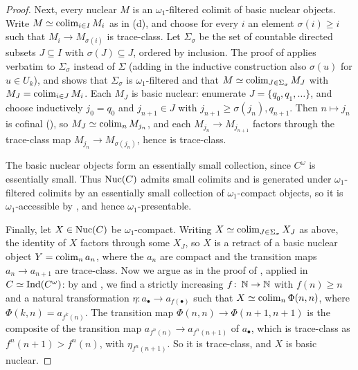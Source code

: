 \begin{proof}
		Next, every nuclear $M$ is an $\omega_1$-filtered colimit of basic nuclear objects. Write $M \simeq \operatorname{colim}_{i \in I} M_i$ as in (d), and choose for every $i$ an element $\sigma(i) \geq i$ such that $M_i \to M_{\sigma(i)}$ is trace-class. Let $\Sigma_{\sigma}$ be the set of countable directed subsets $J \subseteq I$ with $\sigma(J) \subseteq J$, ordered by inclusion. The proof of  applies verbatim to $\Sigma_{\sigma}$ instead of $\Sigma$ (adding in the inductive construction also $\sigma(u)$ for $u \in U_k$), and shows that $\Sigma_{\sigma}$ is $\omega_1$-filtered and that $M \simeq \operatorname{colim}_{J \in \Sigma_{\sigma}} M_J$ with $M_J = \operatorname{colim}_{i \in J} M_i$. Each $M_J$ is basic nuclear: enumerate $J = \{q_0,q_1,\dots\}$, and choose inductively $j_0 = q_0$ and $j_{n+1} \in J$ with $j_{n+1} \geq \sigma(j_n), q_{n+1}$. Then $n \mapsto j_n$ is cofinal (), so $M_J \simeq \operatorname{colim}_n M_{j_n}$, and each $M_{j_n} \to M_{j_{n+1}}$ factors through the trace-class map $M_{j_n} \to M_{\sigma(j_n)}$, hence is trace-class.

		The basic nuclear objects form an essentially small collection, since $C^{\omega}$ is essentially small. Thus $\operatorname{Nuc}(C)$ admits small colimits and is generated under $\omega_1$-filtered colimits by an essentially small collection of $\omega_1$-compact objects, so it is $\omega_1$-accessible by \cite[Proposition~5.4.2.2]{lurie2009HTT}, and hence $\omega_1$-presentable.

		Finally, let $X \in \operatorname{Nuc}(C)$ be $\omega_1$-compact. Writing $X \simeq \operatorname{colim}_{J \in \Sigma_{\sigma}} X_J$ as above, the identity of $X$ factors through some $X_J$, so $X$ is a retract of a basic nuclear object $Y = \operatorname{colim}_n a_n$, where the $a_n$ are compact and the transition maps $a_n \to a_{n+1}$ are trace-class. Now we argue as in the proof of , applied in $C \simeq \operatorname{Ind}(C^{\omega})$: by  and , we find a strictly increasing $f\colon \operatorname{\mathbb N} \to \operatorname{\mathbb N}$ with $f(n) \geq n$ and a natural transformation $\eta\colon a_{\bullet} \to a_{f(\bullet)}$ such that $X \simeq \operatorname{colim}_n \Phi(n,n)$, where $\Phi(k,n) = a_{f^k(n)}$. The transition map $\Phi(n,n) \to \Phi(n+1,n+1)$ is the composite of the transition map $a_{f^n(n)} \to a_{f^n(n+1)}$ of $a_{\bullet}$, which is trace-class as $f^n(n+1) > f^n(n)$, with $\eta_{f^n(n+1)}$. So it is trace-class, and $X$ is basic nuclear.
	\end{proof}

